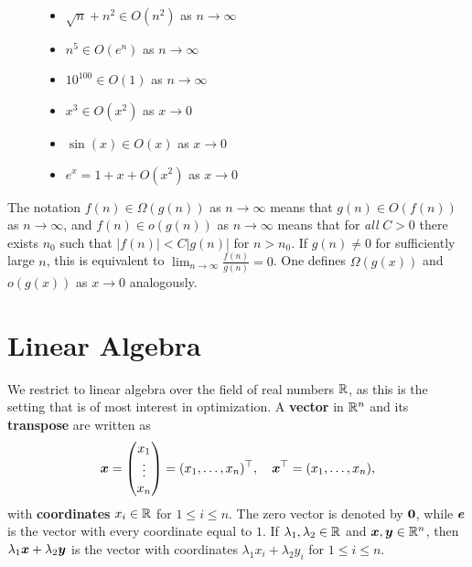 \documentclass[11pt,a4paper]{memoir}
\begin{document}
\begin{figure}[h!]
\begin{minipage}{0.45\textwidth}
 \begin{itemize}
 \item $\sqrt{n}+n^2\in O(n^2)$ as $n\to \infty$
 \item $n^5\in O(e^{n})$ as $n\to \infty$
 \item $10^{100}\in O(1)$ as $n\to \infty$
 \end{itemize}
\end{minipage}
%
\begin{minipage}{0.45\textwidth}
  \begin{itemize}
 \item $x^3\in O(x^2)$ as $x\to 0$
 \item $\sin(x) \in O(x)$ as $x\to 0$
 \item $e^x = 1+x+O(x^2)$ as $x\to 0$
 \end{itemize}
\end{minipage}
\end{figure}

The notation $f(n)\in \Omega(g(n))$ as $n\to \infty$ means that $g(n)\in O(f(n))$ as $n\to \infty$, and $f(n)\in o(g(n))$ as $n\to \infty$ means that for {\em all} $C>0$ there exists $n_0$ such that $|f(n)|<C|g(n)|$ for $n>n_0$. If $g(n)\neq 0$ for sufficiently large $n$, this is equivalent to $\lim_{n\to \infty}\frac{f(n)}{g(n)} = 0$. One defines $\Omega(g(x))$ and $o(g(x))$  as $x\to 0$ analogously.

\section{Linear Algebra}
We restrict to linear algebra over the field of real numbers $\mathbb{R}$, as this is the setting that is of most interest in optimization. A \textbf{vector} in $\mathbb{R}^n$ and its \textbf{transpose} are written as
\begin{equation*}
  \bm{x} = \begin{pmatrix} x_{1}\\
                    \vdots\\
                    x_{n}
\end{pmatrix} = (x_1,\dots,x_n)^{\top}, \quad 
  \bm{x}^\top = (x_{1}, \dots, x_{n}),
\end{equation*}
with \textbf{coordinates} $x_i\in \mathbb{R}$ for $1\leq i\leq n$. The zero vector is denoted by $\bm{0}$, while $\bm{e}$ is the vector with every coordinate equal to $1$. If $\lambda_1,\lambda_2\in \mathbb{R}$ and $\bm{x},\bm{y}\in \mathbb{R}^n$, then $\lambda_1 \bm{x}+\lambda_2\bm{y}$ is the vector with coordinates $\lambda_1x_i+\lambda_2y_i$ for $1\leq i\leq n$.
\end{document}
